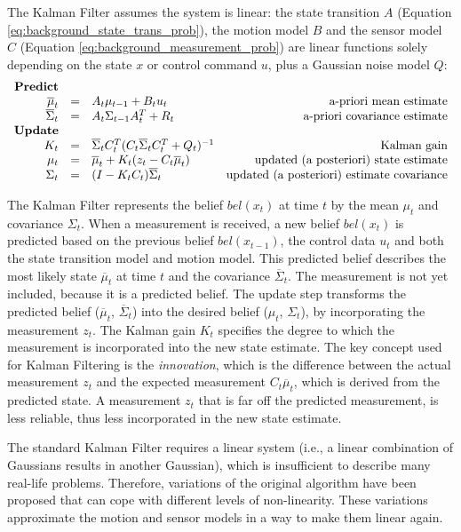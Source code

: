 The Kalman Filter assumes the system is linear: the state transition $A$ (Equation \ref{eq:background_state_trans_prob}), the motion model $B$ and the sensor model $C$ (Equation \ref{eq:background_measurement_prob}) are linear functions solely depending on the state $x$ or control command $u$, plus a Gaussian noise model $Q$:
\begin{equation}
\label{eq:KF}
\begin{array}{rclr}
\text{\textbf{Predict}} \\
\overline{\mu}_t & = & A_t \mu_{t-1} + B_t u_t  & \text{a-priori mean estimate} \\
\overline{\Sigma}_t & = & A_t \Sigma_{t-1} A_t^T + R_t  & \text{a-priori covariance estimate} \\
\text{\textbf{Update}} \\
K_t & = & \overline{\Sigma}_t C_t^T (C_t \overline{\Sigma}_t C_t^T + Q_t)^{-1} & \text{Kalman gain} \\
\mu_t & = & \overline{\mu}_t + K_t(z_t - C_t \overline{\mu}_t) & \text{updated (a posteriori) state estimate} \\
\Sigma_t & = & (I - K_t C_t) \overline{\Sigma}_t & \text{updated (a posteriori) estimate covariance}
\end{array}
\end{equation}

The Kalman Filter represents the belief $bel(x_t)$ at time $t$ by the mean $\mu_t$ and covariance $\Sigma_t$.
When a measurement is received, a new belief $bel(x_t)$ is predicted based on the previous belief $bel(x_{t-1})$, the control data $u_t$ and both the state transition model and motion model.
This predicted belief describes the most likely state $\overline{\mu}_t$ at time $t$ and the covariance $\overline{\Sigma}_t$.
The measurement is not yet included, because it is a predicted belief.
The update step transforms the predicted belief ($\overline{\mu}_t$, $\overline{\Sigma}_t$) into the desired belief ($\mu_t$, $\Sigma_t$), by incorporating the measurement $z_t$.
The Kalman gain $K_t$ specifies the degree to which the measurement is incorporated into the new state estimate.
The key concept used for Kalman Filtering is the \textit{innovation}, which is the difference between the actual measurement $z_t$ and the expected measurement $C_t \overline{\mu}_t$, which is derived from the predicted state.
A measurement $z_t$ that is far off the predicted measurement, is less reliable, thus less incorporated in the new state estimate.

The standard Kalman Filter requires a linear system (i.e., a linear combination of Gaussians results in another Gaussian), which is insufficient to describe many real-life problems.
Therefore, variations of the original algorithm have been proposed that can cope with different levels of non-linearity.
These variations approximate the motion and sensor models in a way to make them linear again.


